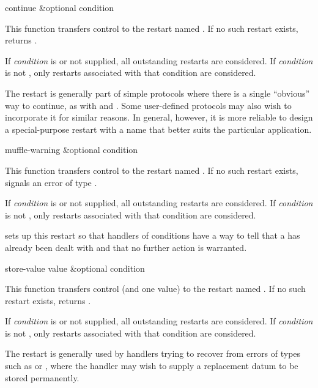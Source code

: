 \begin{defun}[Function]
continue &optional condition

  This function transfers control to the restart named . If no such
  restart exists,  returns .

 If \emph{condition} is  or not supplied, all outstanding restarts
are considered.
If \emph{condition} is not , only restarts associated
with that condition are considered.

  The  restart is generally part of simple protocols where there is
  a single ``obvious'' way to continue, as with  and . Some
  user-defined protocols may also wish to incorporate it for similar reasons.
  In general, however, it is more reliable to design a special-purpose restart
  with a name that better suits the particular application.
\end{defun}

\begin{defun}[Function]
muffle-warning &optional condition

  This function transfers control to the restart named .
  If no such restart exists,  signals an error of type 
  .
 
 If \emph{condition} is  or not supplied, all outstanding restarts
are considered.
If \emph{condition} is not , only restarts associated
with that condition are considered.

   sets up this restart so that handlers of  conditions have
  a way to tell  that a  has already been dealt with and
  that no further action is warranted.
\end{defun}

\begin{defun}[Function]
store-value value &optional condition

  This function transfers control (and one value) to the restart named
  . If no such restart exists,  returns .

 If \emph{condition} is  or not supplied, all outstanding restarts
are considered.
If \emph{condition} is not , only restarts associated
with that condition are considered.

  The  restart is generally used by handlers trying to recover
  from errors of types such as  or , where the handler
  may wish to supply a replacement datum to be stored permanently.
\end{defun}

